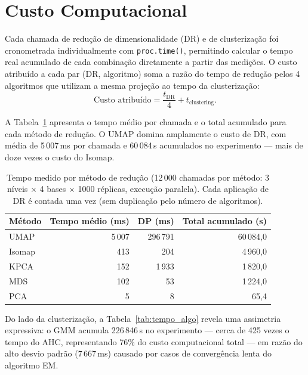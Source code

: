 \documentclass[12pt,a4paper]{report}
\begin{document}
\section{Custo Computacional}

Cada chamada de redução de dimensionalidade (DR) e de clusterização foi
cronometrada individualmente com \texttt{proc.time()}, permitindo calcular o
tempo real acumulado de cada combinação diretamente a partir das medições. O
custo atribuído a cada par (DR, algoritmo) soma a razão do tempo de redução
pelos 4 algoritmos que utilizam a mesma projeção ao tempo da clusterização:
%
\begin{equation}
  \text{Custo atribuído} = \frac{t_{\text{DR}}}{4} + t_{\text{clustering}}.
\end{equation}

A Tabela~\ref{tab:tempo_dr} apresenta o tempo médio por chamada e o total
acumulado para cada método de redução. O UMAP domina amplamente o custo de
DR, com média de 5\,007\,ms por chamada e 60\,084\,s acumulados no
experimento --- mais de doze vezes o custo do Isomap.

\begin{table}[ht]
  \centering
  \caption{Tempo medido por método de redução (12\,000 chamadas por método:
    3 níveis $\times$ 4 bases $\times$ 1000 réplicas, execução paralela).
    Cada aplicação de DR é contada uma vez (sem duplicação pelo número de
    algoritmos).}
  \label{tab:tempo_dr}
  \begin{tabular}{lrrr}
    \toprule
    Método  & Tempo médio (ms) & DP (ms) & Total acumulado (s) \\
    \midrule
    UMAP    & 5\,007 & 296\,791 & 60\,084{,}0 \\
    Isomap  &   413  &     204  &  4\,960{,}0 \\
    KPCA    &   152  &   1\,933 &  1\,820{,}0 \\
    MDS     &   102  &      53  &  1\,224{,}0 \\
    PCA     &     5  &       8  &     65{,}4  \\
    \bottomrule
  \end{tabular}
\end{table}

Do lado da clusterização, a Tabela~\ref{tab:tempo_algo} revela uma
assimetria expressiva: o GMM acumula 226\,846\,s no experimento --- cerca
de 425 vezes o tempo do AHC, representando 76\% do custo computacional
total --- em razão do alto desvio padrão (7\,667\,ms) causado por casos
de convergência lenta do algoritmo EM.
\end{document}
